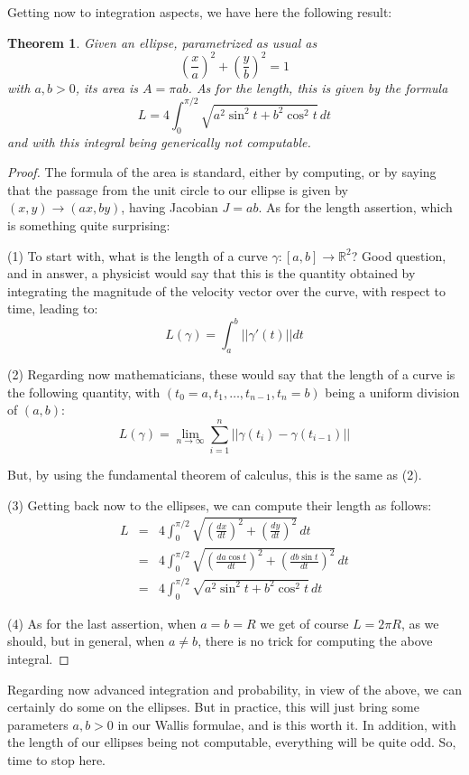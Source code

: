 \documentclass[12pt]{amsbook}
\newtheorem{theorem}{Theorem}[chapter]
\begin{document}
Getting now to integration aspects, we have here the following result:

\begin{theorem}
Given an ellipse, parametrized as usual as
$$\left(\frac{x}{a}\right)^2+\left(\frac{y}{b}\right)^2=1$$
with $a,b>0$, its area is $A=\pi ab$. As for the length, this is given by the formula
$$L=4\int_0^{\pi/2}\sqrt{a^2\sin^2t+b^2\cos^2t}\,dt$$
and with this integral being generically not computable.
\end{theorem}

\begin{proof}
The formula of the area is standard, either by computing, or by saying that the passage from the unit circle to our ellipse is given by $(x,y)\to(ax,by)$, having Jacobian $J=ab$. As for the length assertion, which is something quite surprising:

\medskip

(1) To start with, what is the length of a curve $\gamma:[a,b]\to\mathbb R^2$? Good question, and in answer, a physicist would say that this is the quantity obtained by integrating the magnitude of the velocity vector over the curve, with respect to time, leading to:
$$L(\gamma)=\int_a^b||\gamma'(t)||dt$$

(2) Regarding now mathematicians, these would say that the length of a curve is the following quantity, with $(t_0=a,t_1,\ldots,t_{n-1},t_n=b)$ being a uniform division of $(a,b)$:
$$L(\gamma)=\lim_{n\to\infty}\sum_{i=1}^n||\gamma(t_i)-\gamma(t_{i-1})||$$

But, by using the fundamental theorem of calculus, this is the same as (2).

\medskip

(3) Getting back now to the ellipses, we can compute their length as follows:
\begin{eqnarray*}
L
&=&4\int_0^{\pi/2}\sqrt{\left(\frac{dx}{dt}\right)^2+\left(\frac{dy}{dt}\right)^2}\,dt\\
&=&4\int_0^{\pi/2}\sqrt{\left(\frac{da\cos t}{dt}\right)^2+\left(\frac{db\sin t}{dt}\right)^2}\,dt\\
&=&4\int_0^{\pi/2}\sqrt{a^2\sin^2t+b^2\cos^2t}\,dt
\end{eqnarray*}

(4) As for the last assertion, when $a=b=R$ we get of course $L=2\pi R$, as we should, but in general, when $a\neq b$, there is no trick for computing the above integral.
\end{proof}

Regarding now advanced integration and probability, in view of the above, we can certainly do some on the ellipses. But in practice, this will just bring some parameters $a,b>0$ in our Wallis formulae, and is this worth it. In addition, with the length of our ellipses being not computable, everything will be quite odd. So, time to stop here.
\end{document}
